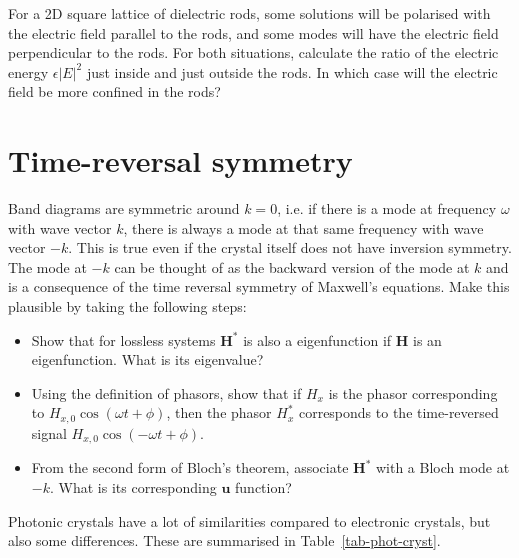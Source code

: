 \begin{exer}
For a 2D square lattice of dielectric rods, some solutions will be polarised with the electric field parallel to the rods, and some modes will have the electric field perpendicular to the rods. For both situations, calculate the ratio of the electric energy $\epsilon |E|^2$ just inside and just outside the rods. In which case will the electric field be more confined in the rods?
\end{exer}

 
\pagebreak

\section{Time-reversal symmetry}

\begin{exer}
Band diagrams are symmetric around $k=0$, i.e. if there is a mode at frequency $\omega$ with wave vector $k$, there is always a mode at that same frequency with wave vector $-k$. This is true even if the crystal itself does not have inversion symmetry. The mode at $-k$ can be thought of as the backward version of the mode at $k$ and is a consequence of the time reversal symmetry of Maxwell's equations. Make this plausible by taking the following steps:
\begin{itemize}
\item Show that for lossless systems ${\mathbf H}^*$ is also a eigenfunction if ${\mathbf H}$ is an eigenfunction. What is its eigenvalue?
\item Using the definition of phasors, show that if $H_x$ is the phasor corresponding to $ H_{x,0} \cos \left( \omega t + \phi \right)$, then the phasor $H^*_x$ corresponds to the time-reversed signal $ H_{x,0} \cos \left(- \omega t + \phi  \right)$.
\item From the second form of Bloch's theorem, associate ${\mathbf H}^*$ with a Bloch mode at $-k$. What is its corresponding ${\mathbf u}$ function?
\end{itemize}

\end{exer}

\pagebreak

\label{week10}

Photonic crystals have a lot of similarities compared to electronic crystals, but also some differences. These are summarised in Table~\ref{tab-phot-cryst}.

